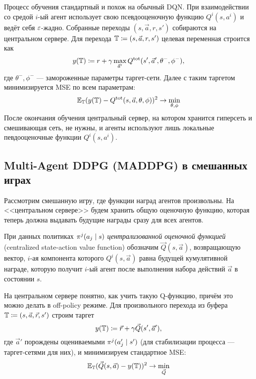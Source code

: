 Процесс обучения стандартный и похож на обычный DQN. При взаимодействии со средой $i$-ый агент использует свою псевдооценочную функцию $Q^i(s, a^i)$ и ведёт себя $\varepsilon$-жадно. Собранные переходы $(s, \vec{a}, r, s')$ собираются на центральном сервере. Для перехода $\mathbb{T} \coloneqq (s, \vec{a}, r, s')$ целевая переменная строится как 
$$y(\mathbb{T}) \coloneqq r + \gamma \max_{\vec{a}'} Q^{\mathrm{tot}}(s', \vec{a}', \theta^-, \phi^-),$$
где $\theta^-, \phi^-$ --- замороженные параметры таргет-сети. Далее с таким таргетом минимизируется MSE по всем параметрам:
$$\mathbb{E}_{\mathbb{T}} (y(\mathbb{T}) - Q^{\mathrm{tot}}(s, \vec{a}, \theta, \phi))^2 \to \min_{\theta, \phi}$$
После окончания обучения центральный сервер, на котором хранится гиперсеть и смешивающая сеть, не нужны, и агенты используют лишь локальные певдооценочные функции $Q^i(s, a^i)$.

\subsection{Multi-Agent DDPG (MADDPG) в смешанных играх}

Рассмотрим смешанную игру, где функции наград агентов произвольны. На <<центральном сервере>> будем хранить общую оценочную функцию, которая теперь должна выдавать будущие награды сразу для всех агентов. 

\begin{definition}
При данных политиках $\pi^j(a_j \HM\mid s)$ \emph{централизованной оценочной функцией} (centralized state-action value function)  обозначим $\vec{Q}(s, \vec{a})$, возвращающую вектор, $i$-ая компонента которого $Q^i(s, \vec{a})$ равна будущей кумулятивной награде, которую получит $i$-ый агент после выполнения набора действий $\vec{a}$ в состоянии $s$.
\end{definition}

На центральном сервере понятно, как учить такую Q-функцию, причём это можно делать в off-policy режиме. Для произвольного перехода из буфера $\mathbb{T} \coloneqq (s, \vec{a}, \vec{r}, s')$ строим таргет
$$y(\mathbb{T}) \coloneqq \vec{r} + \gamma \vec{Q}(s', \vec{a}'),$$
где $\vec{a}'$ порождены оцениваемыми $\pi^j(a'_j \HM\mid s')$ (для стабилизации процесса --- таргет-сетями для них), и минимизируем стандартное MSE:
$$\mathbb{E}_{\mathbb{T}} (\vec{Q}(s, \vec{a}) - y(\mathbb{T}))^2 \to \min_{\vec{Q}}$$

